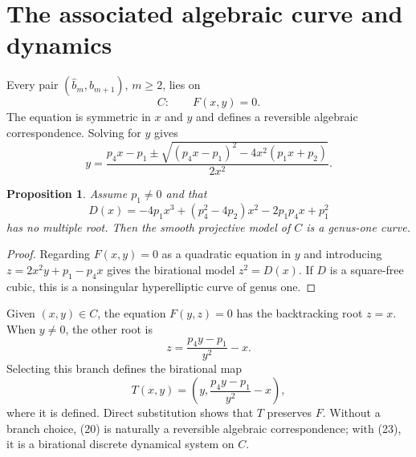 \documentclass[11pt]{article}
\newtheorem{proposition}[theorem]{Proposition}
\theoremstyle{remark}
\begin{document}
\section{The associated algebraic curve and dynamics}
Every pair $(\widehat b_m,\widehat b_{m+1})$, $m\ge2$, lies on
\begin{equation}
C:\qquad F(x,y)=0.
\end{equation}
The equation is symmetric in $x$ and $y$ and defines a reversible algebraic correspondence. Solving for $y$ gives
\begin{equation}
y=\frac{p_4x-p_1\pm\sqrt{(p_4x-p_1)^2-4x^2(p_1x+p_2)}}{2x^2}.
\end{equation}
\begin{proposition}
Assume $p_1\ne0$ and that
\begin{equation}
D(x)=-4p_1x^3+(p_4^2-4p_2)x^2-2p_1p_4x+p_1^2
\end{equation}
has no multiple root. Then the smooth projective model of $C$ is a genus-one curve.
\end{proposition}
\begin{proof}
Regarding $F(x,y)=0$ as a quadratic equation in $y$ and introducing $z=2x^2y+p_1-p_4x$ gives the birational model $z^2=D(x)$. If $D$ is a square-free cubic, this is a nonsingular hyperelliptic curve of genus one.
\end{proof}
Given $(x,y)\in C$, the equation $F(y,z)=0$ has the backtracking root $z=x$. When $y\ne0$, the other root is
\[
z=\frac{p_4y-p_1}{y^2}-x.
\]
Selecting this branch defines the birational map
\begin{equation}
T(x,y)=\left(y,\frac{p_4y-p_1}{y^2}-x\right),
\end{equation}
where it is defined. Direct substitution shows that $T$ preserves $F$. Without a branch choice, (20) is naturally a reversible algebraic correspondence; with (23), it is a birational discrete dynamical system on $C$.
\end{document}
